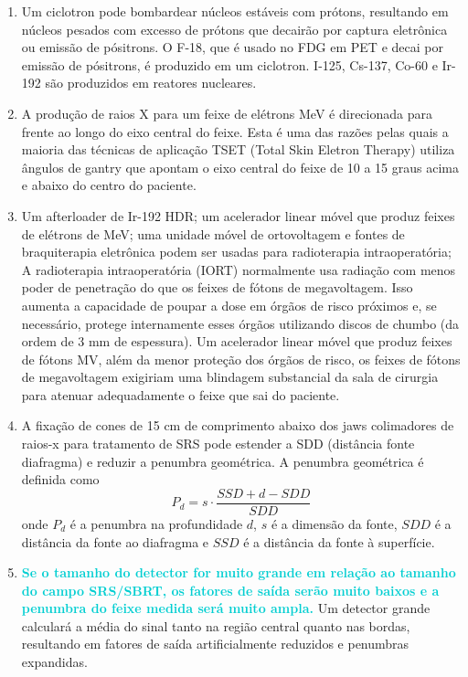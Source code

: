 \documentclass[11pt,a4paper]{article}
\begin{document}
\begin{enumerate}
        \item Um ciclotron pode bombardear núcleos estáveis com prótons, resultando em núcleos pesados com excesso de prótons que decairão por captura eletrônica ou emissão de pósitrons. O F-18, que é usado no FDG em PET e decai por emissão de pósitrons, é produzido em um ciclotron. I-125, Cs-137, Co-60 e Ir-192 são produzidos em reatores nucleares.

        \item A produção de raios X para um feixe de elétrons MeV é direcionada para frente ao longo do eixo central do feixe. Esta é uma das razões pelas quais a maioria das técnicas de aplicação TSET (Total Skin Eletron Therapy) utiliza ângulos de gantry que apontam o eixo central do feixe de 10 a 15 graus acima e abaixo do centro do paciente.

        \item Um afterloader de Ir-192 HDR; um acelerador linear móvel que produz feixes de elétrons de MeV; uma unidade móvel de ortovoltagem e fontes de braquiterapia eletrônica podem ser usadas para radioterapia intraoperatória; A radioterapia intraoperatória (IORT) normalmente usa radiação com menos poder de penetração do que os feixes de fótons de megavoltagem. Isso aumenta a capacidade de poupar a dose em órgãos de risco próximos e, se necessário, protege internamente esses órgãos utilizando discos de chumbo (da ordem de 3 mm de espessura). Um acelerador linear móvel que produz feixes de fótons MV, além da menor proteção dos órgãos de risco, os feixes de fótons de megavoltagem exigiriam uma blindagem substancial da sala de cirurgia para atenuar adequadamente o feixe que sai do paciente.

        \item A fixação de cones de 15 cm de comprimento abaixo dos jaws colimadores de raios-x para tratamento de SRS pode estender a SDD (distância fonte diafragma) e reduzir a penumbra geométrica. A penumbra geométrica é definida como $$P_d = s \cdot \frac{SSD + d - SDD}{SDD}$$ onde $P_d$ é a penumbra na profundidade $d$, $s$ é a dimensão da fonte, $SDD$ é a distância da fonte ao diafragma e $SSD$ é a distância da fonte à superfície. 

        \item \textcolor{DarkTurquoise}{\textbf{Se o tamanho do detector for muito grande em relação ao tamanho do campo SRS/SBRT, os fatores de saída serão muito baixos e a penumbra do feixe medida será muito ampla.}} Um detector grande calculará a média do sinal tanto na região central quanto nas bordas, resultando em fatores de saída artificialmente reduzidos e penumbras expandidas.


\end{enumerate}
\end{document}
